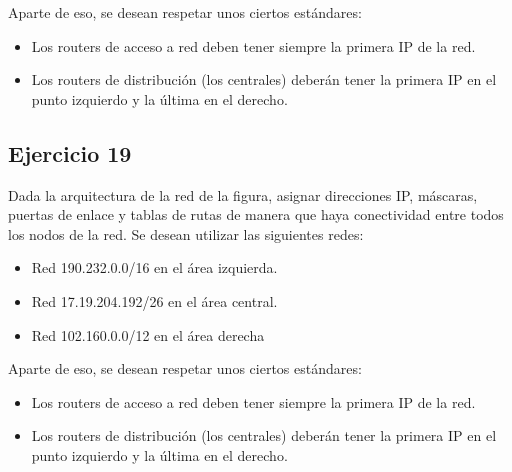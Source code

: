 \documentclass[letterpaper,10pt,spanish]{sphinxmanual}
\begin{document}
\begin{figure}[htbp]
\centering

\noindent{}
\end{figure}

\sphinxAtStartPar
Aparte de eso, se desean respetar unos ciertos estándares:
\begin{itemize}
\item {} 
\sphinxAtStartPar
Los routers de acceso a red deben tener siempre la primera IP de la red.

\item {} 
\sphinxAtStartPar
Los routers de distribución (los centrales) deberán tener la primera IP en el punto izquierdo y la última en el derecho.

\end{itemize}


\subsection{Ejercicio 19}
\label{\detokenize{t2_integracion_elementos/ejercicios_subredes_ipv4/ejercicios_dos_router:ejercicio-19}}
\sphinxAtStartPar
Dada la arquitectura de la red de la figura, asignar direcciones IP, máscaras, puertas de enlace y tablas de rutas de manera que haya conectividad entre todos
los nodos de la red. Se desean utilizar las siguientes redes:
\begin{itemize}
\item {} 
\sphinxAtStartPar
Red 190.232.0.0/16 en el área izquierda.

\item {} 
\sphinxAtStartPar
Red 17.19.204.192/26 en el área central.

\item {} 
\sphinxAtStartPar
Red 102.160.0.0/12 en el área derecha

\end{itemize}

\begin{figure}[htbp]
\centering

\noindent{}
\end{figure}

\sphinxAtStartPar
Aparte de eso, se desean respetar unos ciertos estándares:
\begin{itemize}
\item {} 
\sphinxAtStartPar
Los routers de acceso a red deben tener siempre la primera IP de la red.

\item {} 
\sphinxAtStartPar
Los routers de distribución (los centrales) deberán tener la primera IP en el punto izquierdo y la última en el derecho.

\end{itemize}
\end{document}

